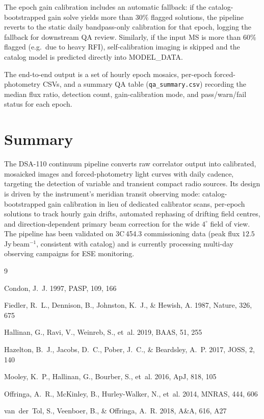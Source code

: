 \documentclass[twocolumn,11pt]{article}
\newcommand{\dsa}{DSA-110\xspace}
\newcommand{\jybeam}{Jy\,beam$^{-1}$\xspace}
\begin{document}
The epoch gain calibration includes an automatic fallback: if the
catalog-bootstrapped gain solve yields more than 30\% flagged solutions,
the pipeline reverts to the static daily bandpass-only calibration for
that epoch, logging the fallback for downstream QA review.  Similarly,
if the input MS is more than 60\% flagged (e.g.\ due to heavy RFI),
self-calibration imaging is skipped and the catalog model is predicted
directly into MODEL\_DATA.

The end-to-end output is a set of hourly epoch mosaics, per-epoch
forced-photometry CSVs, and a summary QA table
(\texttt{qa\_summary.csv}) recording the median flux ratio, detection
count, gain-calibration mode, and pass/warn/fail status for each epoch.


\section{Summary}\label{sec:summary}

The \dsa continuum pipeline converts raw correlator output into
calibrated, mosaicked images and forced-photometry light curves with
daily cadence, targeting the detection of variable and transient compact
radio sources.  Its design is driven by the instrument's meridian transit
observing mode: catalog-bootstrapped gain calibration in lieu of
dedicated calibrator scans, per-epoch solutions to track hourly gain
drifts, automated rephasing of drifting field centres, and
direction-dependent primary beam correction for the wide $4^{\circ}$
field of view.  The pipeline has been validated on 3C\,454.3 commissioning
data (peak flux $12.5$\,\jybeam, consistent with catalog) and is
currently processing multi-day observing campaigns for ESE monitoring.



\begin{thebibliography}{9}

Condon, J.~J. 1997, PASP, 109, 166

Fiedler, R.~L., Dennison, B., Johnston, K.~J., \& Hewish, A. 1987,
Nature, 326, 675

Hallinan, G., Ravi, V., Weinreb, S., et~al. 2019, BAAS, 51, 255

Hazelton, B.~J., Jacobs, D.~C., Pober, J.~C., \& Beardsley, A.~P.
2017, JOSS, 2, 140

Mooley, K.~P., Hallinan, G., Bourber, S., et~al. 2016, ApJ, 818, 105

Offringa, A.~R., McKinley, B., Hurley-Walker, N., et~al. 2014,
MNRAS, 444, 606

van~der~Tol, S., Veenboer, B., \& Offringa, A.~R. 2018, A\&A, 616,
A27

\end{thebibliography}
\end{document}
